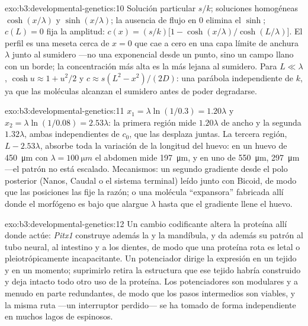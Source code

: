 \begin{solution}{exo:b3:developmental-genetics:10}
Solución particular $s/k$; soluciones homogéneas $\cosh(x/\lambda)$ y
$\sinh(x/\lambda)$; la ausencia de flujo en $0$ elimina el $\sinh$;
$c(L) = 0$ fija la amplitud:
$c(x) = (s/k)\bigl[1 - \cosh(x/\lambda)/\cosh(L/\lambda)\bigr]$. El
perfil es una meseta cerca de $x = 0$ que cae a cero en una capa límite
de anchura $\lambda$ junto al sumidero ---no una exponencial desde un
punto, sino un campo llano con un borde; la concentración más alta es
la más lejana al sumidero. Para $L \ll \lambda$, $\cosh u \approx 1 +
u^{2}/2$ y $c \approx s(L^{2} - x^{2})/(2D)$: una parábola independiente
de $k$, ya que las moléculas alcanzan el sumidero antes de poder
degradarse.
\end{solution}

\begin{solution}{exo:b3:developmental-genetics:11}
$x_{1} = \lambda\ln(1/0.3) = 1.20\lambda$ y $x_{2} = \lambda\ln(1/0.08)
= 2.53\lambda$: la primera región mide $1.20\lambda$ de ancho y la
segunda $1.32\lambda$, ambas independientes de $c_{0}$, que las
desplaza juntas. La tercera región, $L - 2.53\lambda$, absorbe toda la
variación de la longitud del huevo: en un huevo de \qty{450}{\micro m}
con $\lambda = \qty{100}{\micro m}$ el abdomen mide
\qty{197}{\micro m}, y en uno de \qty{550}{\micro m},
\qty{297}{\micro m} ---el patrón no está escalado. Mecanismos: un
segundo gradiente desde el polo posterior (Nanos, Caudal o el sistema
terminal) leído junto con Bicoid, de modo que las posiciones las fije
la razón; o una molécula ``expansora'' fabricada allí donde el
morfógeno es bajo que alargue $\lambda$ hasta que el gradiente llene el
huevo.
\end{solution}

\begin{solution}{exo:b3:developmental-genetics:12}
Un cambio codificante altera la proteína allí donde actúe:
\emph{Pitx1} construye además la  y la mandíbula, y \emph{} da además su patrón al tubo neural, al intestino y a los
dientes, de modo que una proteína rota es letal o pleiotrópicamente
incapacitante. Un potenciador dirige la expresión en un tejido y en un
momento; suprimirlo retira la estructura que ese tejido habría
construido y deja intacto todo otro uso de la proteína. Los
potenciadores son modulares y a menudo en parte redundantes, de modo
que los pasos intermedios son viables, y la misma ruta ---un
interruptor perdido--- se ha tomado de forma independiente en muchos
lagos de espinosos.
\end{solution}

